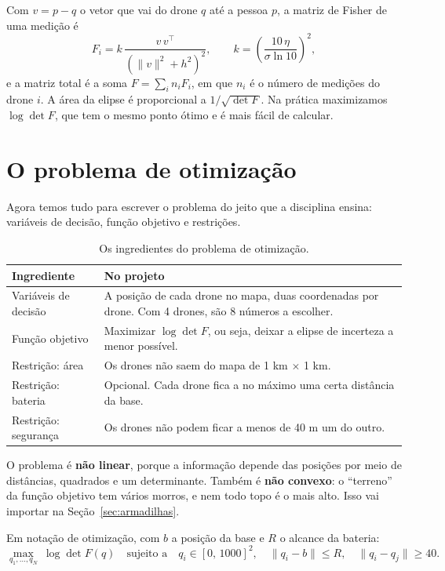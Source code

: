\documentclass[11pt,a4paper]{article}
\begin{document}
\begin{conta}
Com $v = p - q$ o vetor que vai do drone $q$ até a pessoa $p$, a matriz de Fisher de uma medição é
\[
  F_i = k\,\frac{v\,v^{\top}}{\left(\lVert v\rVert^2 + h^2\right)^2},
  \qquad k = \left(\frac{10\,\eta}{\sigma \ln 10}\right)^2 ,
\]
e a matriz total é a soma $F = \sum_i n_i F_i$, em que $n_i$ é o número de medições do drone $i$. A área da elipse é proporcional a $1/\sqrt{\det F}$. Na prática maximizamos $\log\det F$, que tem o mesmo ponto ótimo e é mais fácil de calcular.
\end{conta}

\section{O problema de otimização}

Agora temos tudo para escrever o problema do jeito que a disciplina ensina: variáveis de decisão, função objetivo e restrições.

\begin{table}[htbp]
\centering
\small
\begin{tabularx}{\linewidth}{@{}lX@{}}
\toprule
Ingrediente & No projeto \\
\midrule
Variáveis de decisão & A posição de cada drone no mapa, duas coordenadas por drone. Com 4 drones, são 8 números a escolher. \\
Função objetivo & Maximizar $\log\det F$, ou seja, deixar a elipse de incerteza a menor possível. \\
Restrição: área & Os drones não saem do mapa de 1 km $\times$ 1 km. \\
Restrição: bateria & Opcional. Cada drone fica a no máximo uma certa distância da base. \\
Restrição: segurança & Os drones não podem ficar a menos de 40 m um do outro. \\
\bottomrule
\end{tabularx}
\caption{Os ingredientes do problema de otimização.}
\end{table}

O problema é \textbf{não linear}, porque a informação depende das posições por meio de distâncias, quadrados e um determinante. Também é \textbf{não convexo}: o \enquote{terreno} da função objetivo tem vários morros, e nem todo topo é o mais alto. Isso vai importar na Seção~\ref{sec:armadilhas}.

\begin{conta}
Em notação de otimização, com $b$ a posição da base e $R$ o alcance da bateria:
\[
  \max_{q_1,\dots,q_N}\ \log\det F(q)
  \quad\text{sujeito a}\quad
  q_i \in [0,\,1000]^2,\quad
  \lVert q_i - b\rVert \le R,\quad
  \lVert q_i - q_j\rVert \ge 40 .
\]
\end{conta}
\end{document}
